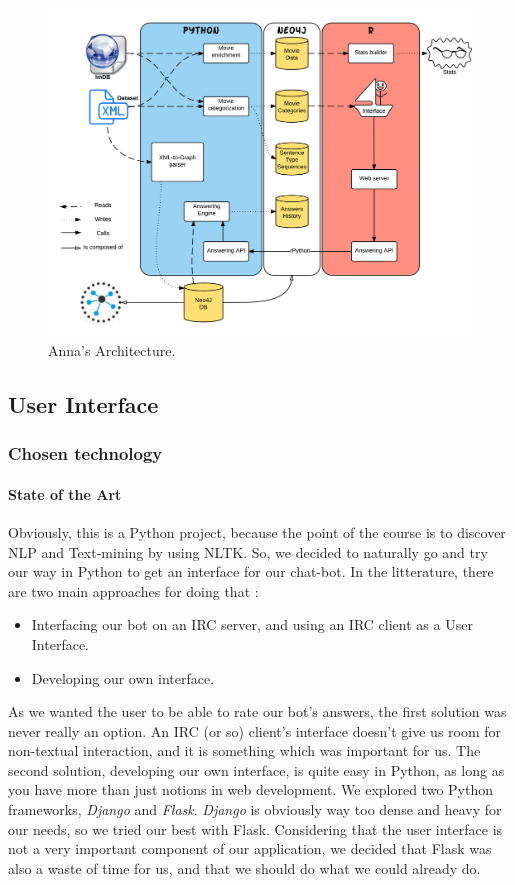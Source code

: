 \begin{figure}[!h]
\begin{center}
\includegraphics[width=1.1\textwidth]{./img/Archi.png}
\end{center}
\caption{Anna's Architecture.}
\label{fig:Archi}
\end{figure}
%
\subsection{User Interface}
\subsubsection{Chosen technology}
\label{subs:Technology}

\paragraph{State of the Art}
\label{par:SotA}
Obviously, this is a Python project, because the point of the course is to discover NLP and Text-mining by using NLTK.
So, we decided to naturally go and try our way in Python to get an interface for our chat-bot.
In the litterature, there are two main approaches for doing that :
\begin{itemize}
    \item Interfacing our bot on an IRC server, and using an IRC client as a User Interface.
    \item Developing our own interface.
\end{itemize}
As we wanted the user to be able to rate our bot's answers, the first solution was never really an option.
An IRC (or so) client's interface doesn't give us room for non-textual interaction, and it is something which was important for us.
The second solution, developing our own interface, is quite easy in Python, as long as you have more than just notions in web development.
We explored two Python frameworks, \textit{Django} and \textit{Flask}.
\textit{Django} is obviously way too dense and heavy for our needs, so we tried our best with Flask.
Considering that the user interface is not a very important component of our application, we decided that Flask was also a waste of time for us, and that we should do what we could already do.


